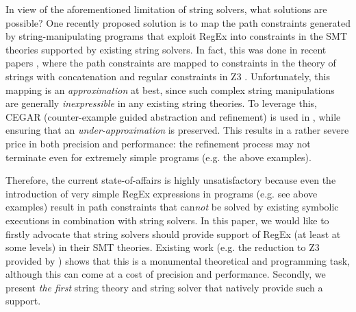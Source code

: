 In view of the aforementioned limitation of string solvers, what solutions are
possible? One recently proposed solution is to map the path constraints
generated by string-manipulating programs that exploit RegEx into constraints
in the SMT theories
supported by existing string solvers. In fact, this was done in recent papers
\cite{aratha,LMK19}, where the path constraints are mapped to constraints
in the theory of strings with concatenation and regular constraints in Z3 
\cite{Z3}. Unfortunately, this mapping is an \emph{approximation} at best, since
such complex string manipulations are generally \emph{inexpressible} in any 
existing string theories. To leverage this, CEGAR (counter-example guided 
abstraction and refinement) is used in \cite{LMK19}, while ensuring that an
\emph{under-approximation} is preserved. 
This results in a rather severe price in both precision and performance: the
refinement process may not terminate even for extremely simple programs
(e.g. the above examples). 

Therefore, the current state-of-affairs is highly unsatisfactory because even 
the introduction of very simple RegEx expressions in programs (e.g. see above 
examples) result in path constraints that can\emph{not} be solved by existing 
symbolic executions in combination with string solvers. In this paper, we would
like to firstly advocate that string solvers should provide support of RegEx 
(at least at some levels) in their SMT theories. Existing work
(e.g. the reduction to Z3 provided by \cite{LMK19}) shows that this is a 
monumental theoretical and programming task, although this can come at a 
cost of precision and performance. Secondly, we present \emph{the first} string
theory and string solver that natively provide such a support.


%
%

